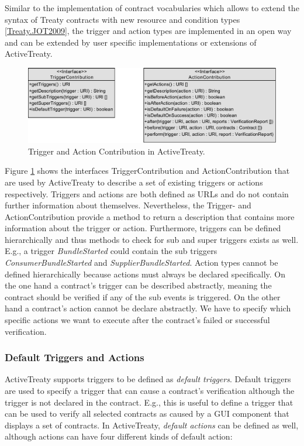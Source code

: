\documentclass{llncs}
\begin{document}
Similar to the implementation of contract vocabularies which allows to extend the syntax of Treaty contracts with new resource and condition types \ref{Treaty.JOT2009}, the trigger and action types are implemented in an open way and can be extended by user specific implementations or extensions of ActiveTreaty.

\begin{figure}[t]
\centering
\includegraphics[width=1.0\textwidth]{ContributorModel1.pdf}
\caption{Trigger and Action Contribution in ActiveTreaty.}
\label{fig:contributuon}
\end{figure}

Figure \ref{fig:contributuon} shows the interfaces TriggerContribution and ActionContribution that are used by ActiveTreaty to describe a set of existing triggers or actions respectively. Triggers and actions are both defined as URLs and do not contain further information about themselves. Nevertheless, the Trigger- and ActionContribution provide a method to return a description that contains more information about the trigger or action. Furthermore, triggers can be defined hierarchically and thus methods to check for sub and super triggers exists as well. E.g., a trigger \textit{BundleStarted} could contain the sub triggers \textit{ConsumerBundleStarted} and \textit{SupplierBundleStarted}. Action types cannot be defined hierarchically because actions must always be declared specifically. On the one hand a contract's trigger can be described abstractly, meaning the contract should be verified if any of the sub events is triggered. On the other hand a contract's action cannot be declare abstractly. We have to specify which specific actions we want to execute after the contract's failed or successful verification.


\subsubsection{Default Triggers and Actions}

ActiveTreaty supports triggers to be defined as \textit{default triggers}. Default triggers are used to specify a trigger that can cause a contract's verification although the trigger is not declared in the contract. E.g., this is useful to define a trigger that can be used to verify all selected contracts as caused by a GUI component that displays a set of contracts. In ActiveTreaty, \textit{default actions} can be defined as well, although actions can have four different kinds of default action:
\end{document}

